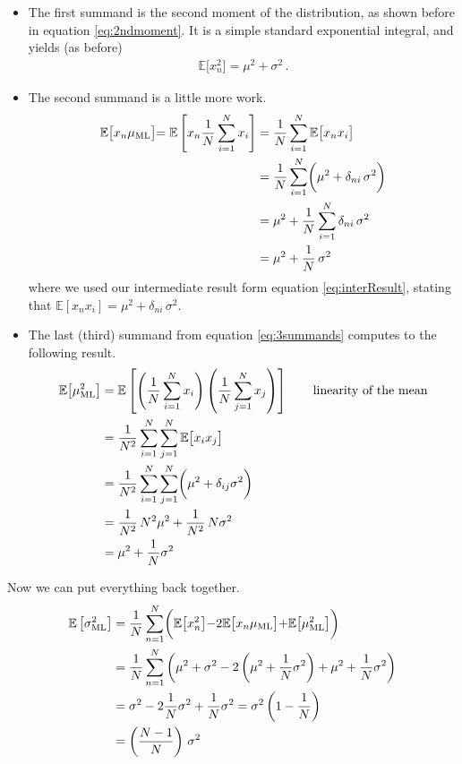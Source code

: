 \documentclass[11pt, DINA4, fleqn]{amsart}
\begin{document}
\begin{itemize}
	
	\item
	The first summand is the second moment of the distribution, as shown before in equation \eqref{eq:2ndmoment}. It is a simple standard exponential integral, and yields (as before)
	\begin{align}
	\mathbb{E}\bigl[x_n^2\bigl] = \mu^2 + \sigma^2 \, .
	\end{align}
	
	\item The second summand is a little more work.
	\begin{align}
	\mathbb{E}\bigl[x_n \mu_{\text{ML}}\bigl] = \mathbb{E}\left[
	x_n \dfrac{1}{N}\sum\displaylimits_{i=1}^{N} x_i
	\right] &=  \dfrac{1}{N} \sum\displaylimits_{i=1}^{N} \mathbb{E}\bigl[x_n x_i\bigl] \\
	&=
	\dfrac{1}{N} \sum\displaylimits_{i=1}^{N}\biggl(\mu^2 + \delta_{ni} \, \sigma ^2 \biggl) \\
	&= \mu^2 + \dfrac{1}{N} \sum\displaylimits_{i=1}^{N} \delta_{ni} \, \sigma^2 \\
	&= \mu^2 + \dfrac{1}{N} \, \sigma^2 \,
	\end{align}
	where we used our intermediate result form equation \eqref{eq:interResult}, stating that $\mathbb{E}[x_n x_i] = \mu^2 + \delta_{ni} \, \sigma^2$.
	
	\item The last (third) summand from equation \eqref{eq:3summands} computes to the following result.
	\begin{align}
	\mathbb{E}\bigl[\mu_{\text{ML}}^2\bigl] &= \mathbb{E} \left[
	\left(\dfrac{1}{N} \sum\displaylimits_{i=1}^{N} x_i\right)
	\left(\dfrac{1}{N} \sum\displaylimits_{j=1}^{N} x_j\right)
	\right] \qquad \text{linearity of the mean}\\
	&= \dfrac{1}{N^2} \sum\displaylimits_{i=1}^{N}\sum\displaylimits_{j=1}^{N}
	\mathbb{E}\bigl[x_i x_j\bigl] \\
	&= \dfrac{1}{N^2} \sum\displaylimits_{i=1}^{N}\sum\displaylimits_{j=1}^{N}
	\biggl(\mu^2 + \delta_{ij} \sigma^2\biggl) \\
	&= \dfrac{1}{N^2}\, N^2\mu^2 + \dfrac{1}{N^2} \, N\sigma^2 \\
	&= \mu^2 + \dfrac{1}{N} \sigma^2
	\end{align}
	
\end{itemize}
Now we can put everything back together.
\begin{align}
\mathbb{E}\left[\sigma^2_{\text{ML}}\right] 
&= \dfrac{1}{N} \sum \displaylimits_{n=1}^{N}
\biggl(
\mathbb{E}\bigl[x_n^2\bigl] - 2 \mathbb{E}\bigl[x_n\mu_{\text{ML}}\bigl]
+ \mathbb{E}\bigl[\mu_{\text{ML}}^2\bigl]
\biggl) \\
&= \dfrac{1}{N} \sum\displaylimits_{n=1}^{N}
\left(
\mu^2 + \sigma^2 - 2\left(\mu^2 + \dfrac{1}{N}\sigma^2\right) + \mu^2 + \dfrac{1}{N} \sigma^2
\right) \\
&=\sigma^2 - 2 \dfrac{1}{N}\sigma^2 + \dfrac{1}{N} \sigma^2 = \sigma^2 \left(1 - \dfrac{1}{N}\right) \\
&= \left(\dfrac{N-1}{N}\right) \, \sigma^2
\end{align}
\end{document}

